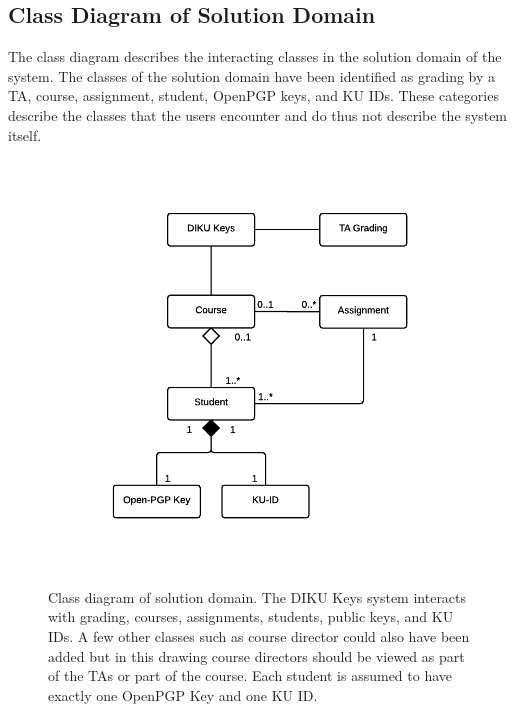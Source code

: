 \documentclass[11pt,a4paper]{report}
\begin{document}
\subsection{Class Diagram of Solution Domain}\label{subsec:class_diagram}
The class diagram describes the interacting classes in the solution domain of the system. The classes of the solution domain have been identified as grading by a TA, course, assignment, student, OpenPGP keys, and KU IDs. These categories describe the classes that the users encounter and do thus not describe the system itself. 
\begin{figure}[H]
    \centering
    \includegraphics[width=\textwidth]{pictures/class_diagram_genaflevering}
    \caption{Class diagram of solution domain. The DIKU Keys system interacts with grading, courses, assignments, students, public keys, and KU IDs. A few other classes such as course director could also have been added but in this drawing course directors should be viewed as part of the TAs or part of the course. Each student is assumed to have exactly one OpenPGP Key and one KU ID.}
    \label{fig:class_diagram}
\end{figure}
\end{document}
